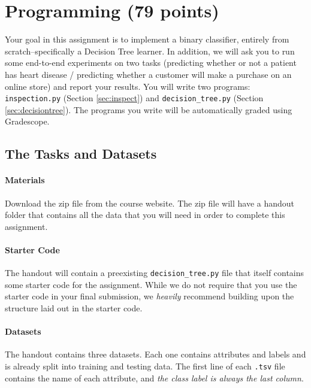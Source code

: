 \documentclass[11pt,addpoints,answers]{exam}
\begin{document}
\section{Programming (79 points)}

Your goal in this assignment is to implement a binary classifier, entirely from scratch--specifically a Decision Tree learner. In addition, we will ask you to run some end-to-end experiments on two tasks (predicting whether or not a patient has heart disease / predicting whether a customer will make a purchase on an online store) and report your results.
%
You will write two programs: \texttt{inspection.py} (Section \ref{sec:inspect}) and \texttt{decision\_tree.py} (Section \ref{sec:decisiontree}). The programs you write will be automatically graded using Gradescope.

\subsection{The Tasks and Datasets}
\label{sec:data}

\paragraph{Materials} Download the zip file from the course website. The zip file will have a handout folder that contains all the data that you will need in order to complete this assignment.

\paragraph{Starter Code} The handout will contain a preexisting \texttt{decision\_tree.py} file that itself contains some starter code for the assignment. While we do not require that you use the starter code in your final submission, we \emph{heavily} recommend building upon the structure laid out in the starter code.

\paragraph{Datasets}

The handout contains three datasets. Each one contains attributes and labels and is already split into training and testing data. The first line of each \lstinline{.tsv} file contains the name of each attribute, and \emph{the class label is always the last column}.
\end{document}
